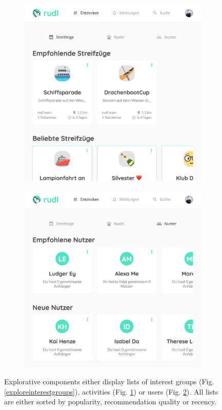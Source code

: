 \documentclass[12pt,numbers=noenddot,parskip,bibliography=totocnumbered,listof=totocnumbered,draft]{scrreprt}
\begin{document}
\begin{figure}
\begin{subfigure}[t]{0.45\textwidth}
\includegraphics[width=\linewidth]{exploreactivities.png}
\caption{}
\label{exploreactivities}
\end{subfigure}%

\bigskip

\begin{subfigure}[t]{0.45\textwidth}%
\centering
\includegraphics[width=\linewidth]{exploreusers.png}
\caption{}
\label{exploreusers}
\end{subfigure}%
\caption[Explorative components]{Explorative components either display lists of interest groups (Fig. \ref{exploreinterestgroups}), activities (Fig. \ref{exploreactivities}) or users (Fig. \ref{exploreusers}). All lists are either sorted by popularity, recommendation quality or recency.}
\label{explore}
\end{figure}
\end{document}
